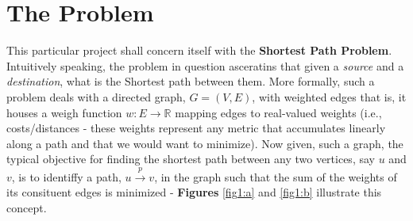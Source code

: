 \documentclass[a4paper, 12pt]{report}
\theoremstyle{definition}
\begin{document}
\chapter{The Problem}
This particular project shall concern itself with the \textbf{Shortest Path Problem}. Intuitively speaking, the problem in question asceratins that given a \emph{source} and a \emph{destination}, what is the Shortest path between them. More formally, such a problem deals with a directed graph,
$G = (V, E)$, with weighted edges that is, it houses a weigh function $w: E \rightarrow \mathbb{R}$ mapping edges to real-valued weights (i.e., costs/distances - these weights represent any metric that accumulates linearly along a path and that we would want to minimize). Now given, such a graph,
the typical objective for finding the shortest path between any two vertices, say $u$ and $v$, is to identiffy a path, $u \xrightarrow{p} v$, in the graph such that the sum of the weights of its consituent edges is minimized \cite{cormenBk,open-dsa,chumbley}- \textbf{Figures} \ref{fig1:a} and \ref{fig1:b} illustrate this concept.
\end{document}
